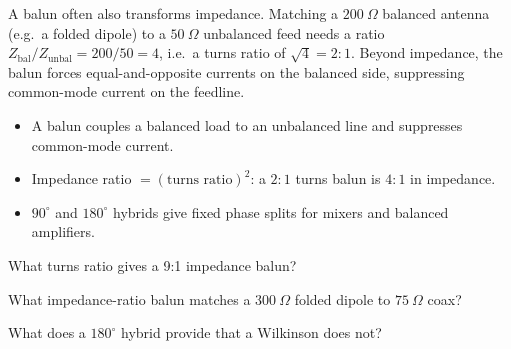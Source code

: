 \begin{workedexample}
A balun often also transforms impedance. Matching a $200\ \Omega$ balanced
antenna (e.g.\ a folded dipole) to a $50\ \Omega$ unbalanced feed needs a ratio
$Z_{\text{bal}}/Z_{\text{unbal}} = 200/50 = 4$, i.e.\ a turns ratio of
$\sqrt{4} = 2{:}1$. Beyond impedance, the balun forces equal-and-opposite
currents on the balanced side, suppressing common-mode current on the feedline.
\end{workedexample}

\begin{keytakeaways}
\begin{itemize}[leftmargin=1.4em,itemsep=2pt]
\item A balun couples a balanced load to an unbalanced line and suppresses common-mode current.
\item Impedance ratio $= (\text{turns ratio})^2$: a $2{:}1$ turns balun is $4{:}1$ in impedance.
\item $90^{\circ}$ and $180^{\circ}$ hybrids give fixed phase splits for mixers and balanced amplifiers.
\end{itemize}
\end{keytakeaways}

\begin{exercises}
\item What turns ratio gives a 9:1 impedance balun?
\item What impedance-ratio balun matches a $300\ \Omega$ folded dipole to $75\ \Omega$ coax?
\item What does a $180^{\circ}$ hybrid provide that a Wilkinson does not?
\end{exercises}

